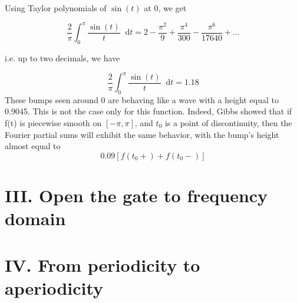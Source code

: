 \documentclass[margin,line]{res}
\newcommand*{\dif}{\mathop{}\!\mathrm{d}}
\begin{document}
\begin{resume}
Using Taylor polynomials of $\sin(t)$ at 0, we get

$$
\frac{2}{\pi}\int_{0}^{\pi}\frac{\sin(t)}{t} \dif t = 2 - \frac{\pi^2}{9} + \frac{\pi^4}{300} - \frac{\pi^6}{17640}+\ldots
$$

i.e. up to two decimals, we have

$$
\frac{2}{\pi}\int_{0}^{\pi}\frac{\sin(t)}{t} \dif t = 1.18
$$
These bumps seen around 0 are behaving like a wave with a height equal to 0.9045. This is not the case only for this function. Indeed, Gibbs showed that if f(t) is piecewise smooth on $[-\pi,\pi]$, and $t_0$ is a point of discontinuity, then the Fourier partial sums will exhibit the same behavior, with the bump's height almost equal to 
$$
0.09\left[ f(t_0+) + f(t_0-)\right]
$$
\clearpage

\section{\sc III. Open the gate to frequency domain}
\clearpage

\section{\sc IV. From periodicity to aperiodicity}
\clearpage

\end{resume}
\end{document}
